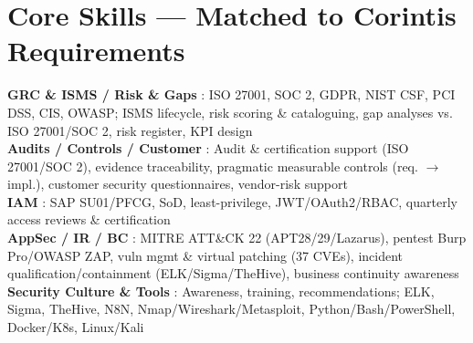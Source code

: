 \documentclass[a4paper,9pt]{article}
\begin{document}
\section{Core Skills — Matched to Corintis Requirements}
\textbf{GRC \& ISMS / Risk \& Gaps} : ISO 27001, SOC 2, GDPR, NIST CSF, PCI DSS, CIS, OWASP; ISMS lifecycle, risk scoring \& cataloguing, gap analyses vs. ISO 27001/SOC 2, risk register, KPI design\\[0.3pt]
\textbf{Audits / Controls / Customer} : Audit \& certification support (ISO 27001/SOC 2), evidence traceability, pragmatic measurable controls (req. $\to$ impl.), customer security questionnaires, vendor-risk support\\[0.3pt]
\textbf{IAM} : SAP SU01/PFCG, SoD, least-privilege, JWT/OAuth2/RBAC, quarterly access reviews \& certification\\[0.3pt]
\textbf{AppSec / IR / BC} : MITRE ATT\&CK 22 (APT28/29/Lazarus), pentest Burp Pro/OWASP ZAP, vuln mgmt \& virtual patching (37 CVEs), incident qualification/containment (ELK/Sigma/TheHive), business continuity awareness\\[0.3pt]
\textbf{Security Culture \& Tools} : Awareness, training, recommendations; ELK, Sigma, TheHive, N8N, Nmap/Wireshark/Metasploit, Python/Bash/PowerShell, Docker/K8s, Linux/Kali
\end{document}
